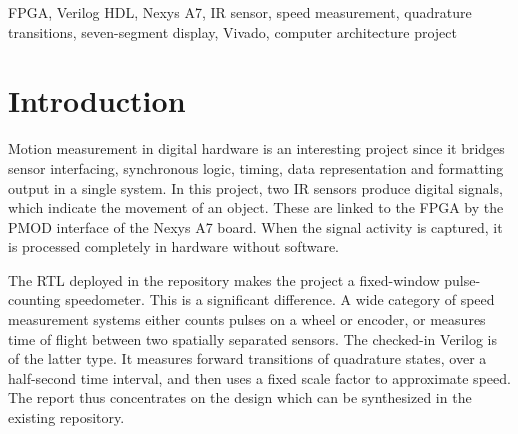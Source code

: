 \documentclass[conference,a4paper]{IEEEtran}
\begin{document}
\clearpage
\maketitle

\begin{abstract}
This report provides a design and implementation of a real-time speed measuring system implemented in Verilog HDL and designed to run on the Digilent Nexys A7 FPGA board. The installed design has two infrared sensors as digital inputs, filters sensor noise, counts valid quadrature transitions within a fixed 0.5s observation window, and converts the result to speed in cm/s with a design-time calibration factor, and displays the result on the onboard seven-segment display. An overspeed indicator is a special red LED. The report is based purposefully on the checked-in RTL and constraints as opposed to a conceptual description alone. That is why it records the real module hierarchy, measurement scheme, display persistence scheme, pin mapping, and current verification status in the repository. Placeholders and blank spaces are provided in any place where the project team will need to insert a hardware-specific value or Vivado-generated screenshots in the future.
\end{abstract}

\begin{IEEEkeywords}
FPGA, Verilog HDL, Nexys A7, IR sensor, speed measurement, quadrature transitions, seven-segment display, Vivado, computer architecture project
\end{IEEEkeywords}

\section{Introduction}
Motion measurement in digital hardware is an interesting project since it bridges sensor interfacing, synchronous logic, timing, data representation and formatting output in a single system. In this project, two IR sensors produce digital signals, which indicate the movement of an object. These are linked to the FPGA by the PMOD interface of the Nexys A7 board. When the signal activity is captured, it is processed completely in hardware without software.

The RTL deployed in the repository makes the project a fixed-window pulse-counting speedometer. This is a significant difference. A wide category of speed measurement systems either counts pulses on a wheel or encoder, or measures time of flight between two spatially separated sensors. The checked-in Verilog is of the latter type. It measures forward transitions of quadrature states, over a half-second time interval, and then uses a fixed scale factor to approximate speed. The report thus concentrates on the design which can be synthesized in the existing repository.
\end{document}
